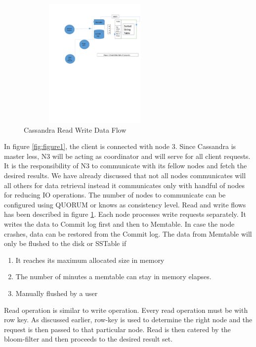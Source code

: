 \documentclass[9pt,twocolumn,twoside]{../../styles/osajnl}
\begin{document}
\begin{figure}[h]
\begin{center}
\includegraphics[width =3in,height=2.5in]{images/Cassandra_Write_Read_figure2}
\caption{Cassandra Read Write Data Flow}
\label{fig:figure2}
\end{center}
\end{figure}

In figure \ref{fig:figure1}, the client is connected with node 3. Since Cassandra is master less, N3 will be acting as coordinator and will serve for all client requests. It is the responsibility of N3 to communicate with its fellow nodes and fetch the desired results. We have already discussed that not all nodes communicates will all others for data retrieval instead it communicates only with handful of nodes for reducing IO operations. The number of nodes to communicate can be configured using QUORUM or knows as consistency level.
Read and write flows has been described in figure \ref{fig:figure2}. Each node processes write requests separately. It writes the data to Commit log first and then to Memtable. In case the node crashes, data can be restored from the Commit log. The data from Memtable will only be flushed to the disk or SSTable if 
\begin{enumerate}
     \item It reaches its maximum allocated size in memory
     \item The number of minutes a memtable can stay in memory elapses.   
     \item Manually flushed by a user  
\end{enumerate}
Read operation is similar to write operation. Every read operation must be with row key. As discussed earlier, row-key is used to determine the right node and the request is then passed to that particular node. Read is then catered by the bloom-filter and then proceeds to the desired result set.
\end{document}
